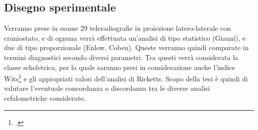 \subsection{Disegno sperimentale}
Verranno prese in esame 29 teleradiografie in proiezione latero-laterale con craniostato, e di ognuna verrà effettuata un'analisi di tipo statistico (Giannì), e due di tipo proporzionale (Enlow, Coben). Queste verranno quindi comparate in termini diagnostici secondo diversi parametri. Tra questi verrà considerata la classe scheletrica, per la quale saranno presi in considerazione anche l'indice Wits\footcite{Jacobson1975} e gli appropriati valori dell'analisi di Ricketts. Scopo della tesi è quindi di valutare l'eventuale concordanza o discordanza tra le diverse analisi cefalometriche considerate.
